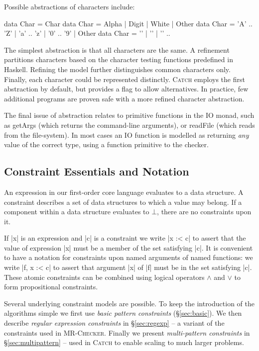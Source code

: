 \documentclass[preprint]{sigplanconf}
\newcommand{\C}[1]{\textsf{#1}}
\newcommand{\catch}{\textsc{Catch}}
\newcommand{\newtool}{\anon{\catch07}{\catch}}
\newcommand{\oldtool}{\anon{\catch05}{\textsc{MR-Checker}}}
\newcommand{\anon}[2]{#2}
\begin{document}
Possible abstractions of characters include:

\ignore\begin{code}
data Char = Char
data Char = Alpha | Digit | White | Other
data Char = 'A' .. 'Z' | 'a' .. 'z' | '0' .. '9' | Other
data Char = '\0' | '\1' | '\2' ..
\end{code}

\noindent The simplest abstraction is that all characters are the same. A refinement partitions characters based on the character testing functions predefined in Haskell. Refining the model further distinguishes common characters only. Finally, each character could be represented distinctly. \catch{} employs the first abstraction by default, but provides a flag to allow alternatives. In practice, few additional programs are proven safe with a more refined character abstraction.

The final issue of abstraction relates to primitive functions in the \C{IO} monad, such as \C{getArgs} (which returns the command-line arguments), or \C{readFile} (which reads from the file-system). In most cases an IO function is modelled as returning \textit{any} value of the correct type, using a function primitive to the checker.


\subsection{Constraint Essentials and Notation}
\label{sec:constraints}

An expression in our first-order core language evaluates to a data structure. A constraint describes a set of data structures to which a value may belong. If a component within a data structure evaluates to $\bot{}$, there are no constraints upon it.

If |x| is an expression and |c| is a constraint we write |x :< c| to assert that the value of expression |x| must be a member of the set satisfying |c|. It is convenient to have a notation for constraints upon named arguments of named functions: we write |f, x :< c| to assert that argument |x| of |f| must be in the set satisfying |c|. These atomic constraints can be combined using logical operators $\wedge{}$ and $\vee{}$ to form propositional constraints.

Several underlying constraint models are possible. To keep the introduction of the algorithms simple we first use \textit{basic pattern constraints} (\S\ref{sec:basic}). We then describe \textit{regular expression constraints} in \S\ref{sec:regexp} -- a variant of the constraints used in \oldtool{}. Finally we present \textit{multi-pattern constraints} in \S\ref{sec:multipattern} -- used in \newtool{} to enable scaling to much larger problems.
\end{document}
